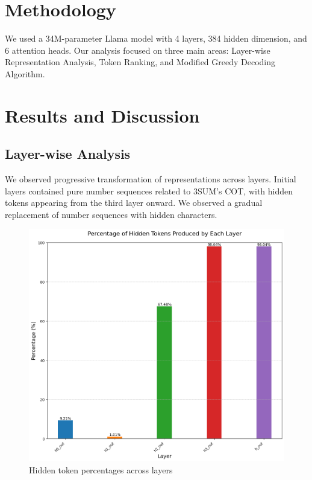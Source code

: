 \documentclass[10pt,a4paper]{article}
\begin{document}
\section{Methodology}
We used a 34M-parameter Llama model with 4 layers, 384 hidden dimension, and 6 attention heads. Our analysis focused on three main areas: Layer-wise Representation Analysis, Token Ranking, and Modified Greedy Decoding Algorithm.

\section{Results and Discussion}

\subsection{Layer-wise Analysis}
We observed progressive transformation of representations across layers. Initial layers contained pure number sequences related to 3SUM's COT, with hidden tokens appearing from the third layer onward. We observed a gradual replacement of number sequences with hidden characters.

\begin{figure}[h]
\centering
\includegraphics[width=\textwidth]{hidden_tokens_percentage_by_layer.png}
\caption{Hidden token percentages across layers}
\label{fig:hidden_token_percentages}
\end{figure}
\end{document}
